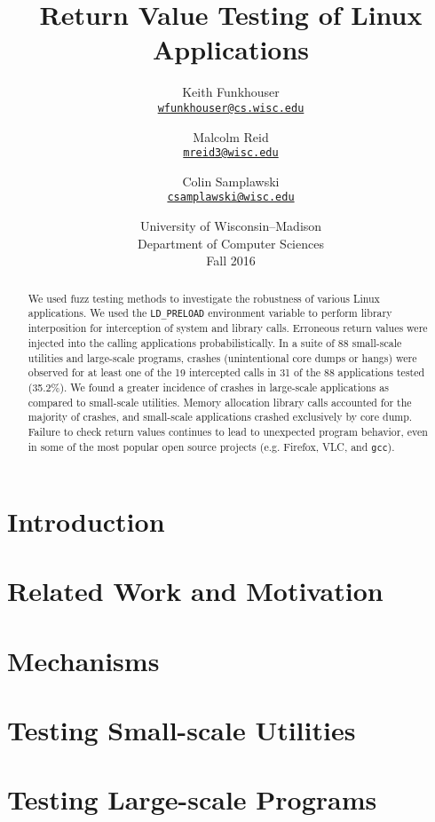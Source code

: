 \documentclass[10pt]{article}
\title{Return Value Testing of Linux Applications}
\author{Keith Funkhouser \\ \texttt{\href{mailto:wfunkhouser@cs.wisc.edu}{wfunkhouser@cs.wisc.edu}}
\and Malcolm Reid\\ \texttt{\href{mailto:mreid3@wisc.edu}{mreid3@wisc.edu}}
\and Colin Samplawski\\ \texttt{\href{mailto:csamplawski@wisc.edu}{csamplawski@wisc.edu}}
}
\date{University of Wisconsin--Madison\\Department of Computer Sciences\\Fall 2016}
\begin{document}
\setlength{\baselineskip}{18pt}
\maketitle

\begin{abstract}
\setlength{\baselineskip}{18pt}
We used fuzz testing methods to investigate the robustness of various Linux applications. We used the \texttt{LD\_PRELOAD} environment variable to perform library interposition for interception of system and library calls. Erroneous return values were injected into the calling applications probabilistically. In a suite of 88 small-scale utilities and large-scale programs, crashes (unintentional core dumps or hangs) were observed for at least one of the 19 intercepted calls in 31 of the 88 applications tested (35.2\%). We found a greater incidence of crashes in large-scale applications as compared to small-scale utilities. Memory allocation library calls accounted for the majority of crashes, and small-scale applications crashed exclusively by core dump. Failure to check return values continues to lead to unexpected program behavior, even in some of the most popular open source projects (e.g. Firefox, VLC, and \texttt{gcc}).
\end{abstract}

\section{Introduction}


\section{Related Work and Motivation}



\section{Mechanisms}



\section{Testing Small-scale Utilities}





\section{Testing Large-scale Programs}

\end{document}
